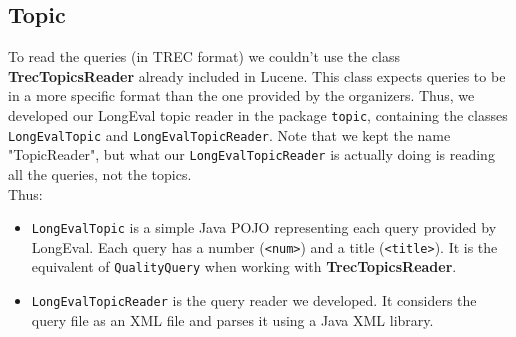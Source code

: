 \subsection{Topic}\label{subsec:topic}
To read the queries (in TREC format) we couldn't use the class \textbf{TrecTopicsReader} already included in Lucene. This class expects queries to be in a more specific format than the one provided by the organizers.
Thus, we developed our LongEval topic reader in the package \texttt{topic}, containing the classes
\texttt{LongEvalTopic} and \texttt{LongEvalTopicReader}. Note that we kept the name "TopicReader", but what our \texttt{LongEvalTopicReader} is actually doing is reading all the queries, not the topics.\\
Thus:
\begin{itemize}
    \item \texttt{LongEvalTopic} is a simple Java POJO representing each query provided by LongEval.
    Each query has a number (\texttt{<num>}) and a title (\texttt{<title>}).
    It is the equivalent of \texttt{QualityQuery} when working with \textbf{TrecTopicsReader}.
    \item \texttt{LongEvalTopicReader} is the query reader we developed.
    It considers the query file as an XML file and parses it using a Java XML library.
\end{itemize}